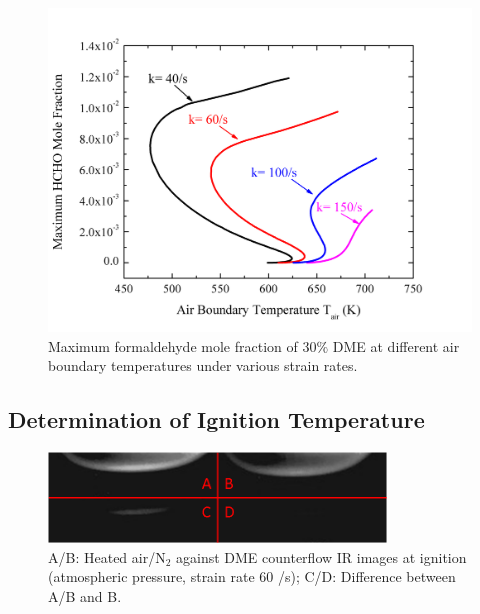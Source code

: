 \begin{figure}[t]
  \centering
  \scriptsize
  \includegraphics[width=1.0\textwidth]{ch-NTC/Scurve-SR.png}
  \normalsize
  \caption{Maximum formaldehyde mole fraction of $30\%$ DME at different air boundary temperatures under various strain rates.}
  \label{fig:Scurve-SR}
\end{figure}

\subsection{Determination of Ignition Temperature} \label{sec:NTC-4.2}

\begin{figure}[ht]
  \centering
  \scriptsize
  \vspace{0.3in}
  \includegraphics[width=0.8\textwidth]{ch-NTC/IR.png}
  \normalsize
  \caption{A/B: Heated air/N$_2$ against DME counterflow IR images at ignition (atmospheric pressure, strain rate $60$ /s); C/D: Difference between A/B and B.}
  \label{fig:IR}
\end{figure}

